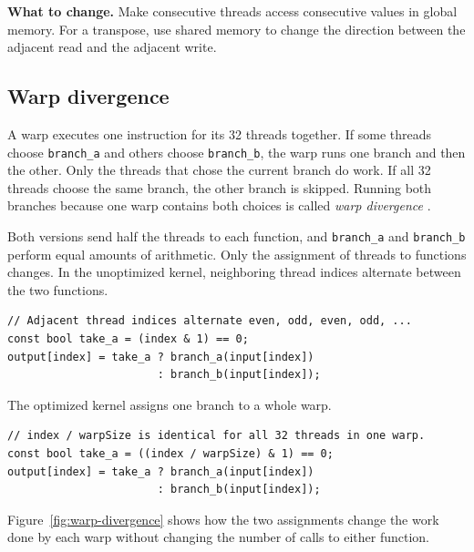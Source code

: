 \documentclass[11pt]{article}
\numberwithin{equation}{section}
\numberwithin{figure}{section}
\numberwithin{table}{section}
\newcommand{\code}[1]{\texttt{#1}}
\begin{document}
\textbf{What to change.}  Make consecutive threads access consecutive values in
global memory.  For a transpose, use shared memory to change the direction between
the adjacent read and the adjacent write.

\FloatBarrier
\subsection{Warp divergence}

A warp executes one instruction for its 32 threads together.  If some threads
choose \code{branch\_a} and others choose \code{branch\_b}, the warp runs one
branch and then the other.  Only the threads that chose the current branch do work.
If all 32 threads choose the same branch, the other branch is skipped.  Running
both branches because one warp contains both choices is called \emph{warp divergence}
\cite{cuda-programming-guide}.

Both versions send half the threads to each function, and \code{branch\_a} and
\code{branch\_b} perform equal amounts of arithmetic.  Only the assignment of
threads to functions changes.  In the unoptimized kernel, neighboring thread
indices alternate between the two functions.
\begin{lstlisting}[language=CUDA,numbers=none,caption={Unoptimized.  One warp contains both branches.}]
// Adjacent thread indices alternate even, odd, even, odd, ...
const bool take_a = (index & 1) == 0;
output[index] = take_a ? branch_a(input[index])
                       : branch_b(input[index]);
\end{lstlisting}
The optimized kernel assigns one branch to a whole warp.
\begin{lstlisting}[language=CUDA,numbers=none,caption={Optimized.  All 32 threads in one warp agree.}]
// index / warpSize is identical for all 32 threads in one warp.
const bool take_a = ((index / warpSize) & 1) == 0;
output[index] = take_a ? branch_a(input[index])
                       : branch_b(input[index]);
\end{lstlisting}

Figure~\ref{fig:warp-divergence} shows how the two assignments change the work done
by each warp without changing the number of calls to either function.
\end{document}
